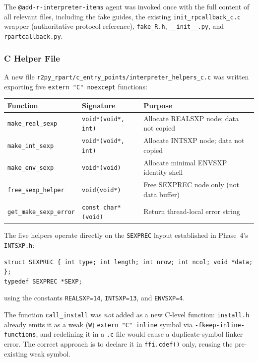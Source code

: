 \documentclass[12pt]{article}
\begin{document}
The \texttt{@add-r-interpreter-items} agent was invoked once with the full content of all relevant files, including the fake guides, the existing \texttt{init\_rpcallback\_c.c} wrapper (authoritative protocol reference), \texttt{fake\_R.h}, \texttt{\_\_init\_\_.py}, and \texttt{rpartcallback.py}.

\subsubsection{C Helper File}

A new file \texttt{r2py\_rpart/c\_entry\_points/interpreter\_helpers\_c.c} was written exporting five \texttt{extern "C" noexcept} functions:
\begin{center}
\begin{tabular}{lll}
\toprule
Function & Signature & Purpose \\
\midrule
\texttt{make\_real\_sexp} & \texttt{void*(void*, int)} & Allocate REALSXP node; data not copied \\
\texttt{make\_int\_sexp} & \texttt{void*(void*, int)} & Allocate INTSXP node; data not copied \\
\texttt{make\_env\_sexp} & \texttt{void*(void)} & Allocate minimal ENVSXP identity shell \\
\texttt{free\_sexp\_helper} & \texttt{void(void*)} & Free SEXPREC node only (not data buffer) \\
\texttt{get\_make\_sexp\_error} & \texttt{const char*(void)} & Return thread-local error string \\
\bottomrule
\end{tabular}
\end{center}

The five helpers operate directly on the \texttt{SEXPREC} layout established in Phase~4's \texttt{INTSXP.h}:
\begin{lstlisting}[style=cpp]
struct SEXPREC { int type; int length; int nrow; int ncol; void *data; };
typedef SEXPREC *SEXP;
\end{lstlisting}
using the constants \texttt{REALSXP=14}, \texttt{INTSXP=13}, and \texttt{ENVSXP=4}.

The function \texttt{call\_install} was \emph{not} added as a new C-level function: \texttt{install.h} already emits it as a weak (\texttt{W}) \texttt{extern "C" inline} symbol via \texttt{-fkeep-inline-functions}, and redefining it in a \texttt{.c} file would cause a duplicate-symbol linker error. The correct approach is to declare it in \texttt{ffi.cdef()} only, reusing the pre-existing weak symbol.
\end{document}
